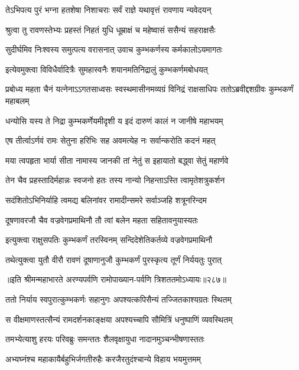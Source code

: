 \twolineshloka
{तेऽभिपत्य पुरं भग्ना हतशेषा निशाचराः}
{सर्वं राज्ञे यथावृत्तं रावणाय न्यवेदयन्}


\twolineshloka
{श्रुत्वा तु रावणस्तेभ्यः प्रहस्तं निहतं युधि}
{धूम्राक्षं च महेष्वासं ससैन्यं सहराक्षसैः}


\twolineshloka
{सुदीर्घमिव निःश्वस्य समुत्पत्य वरासनात्}
{उवाच कुम्भकर्णस्य कर्मकालोऽयमागतः}


\twolineshloka
{इत्येवमुक्त्वा विविधैर्वादित्रैः सुमहास्वनैः}
{शयानमतिनिद्रालुं कुम्भकर्णमबोधयत्}


\threelineshloka
{प्रबोध्य महता चैनं यत्नेनाऽऽगतसाध्वसः}
{स्वस्थमासीनमव्यग्रं विनिद्रं राक्षसाधिपः}
{ततोऽब्रवीद्दशग्रीवः कुम्भकर्णं महाबलम्}


\twolineshloka
{धन्योसि यस्य ते निद्रा कुम्भकर्णेयमीदृशी}
{य इदं दारुणं कालं न जानीषे महाभयम्}


\twolineshloka
{एष तीर्त्वाऽर्णवं रामः सेतुना हरिभिः सह}
{अवमत्येह नः सर्वान्करोति कदनं महत्}


\twolineshloka
{मया त्वपहृता भार्या सीता नामास्य जानकी}
{तां नेतुं स इहायातो बद्ध्वा सेतुं महार्णवे}


\twolineshloka
{तेन चैव प्रहस्तादिर्महान्नः स्वजनो हतः}
{तस्य नान्यो निहन्ताऽस्ति त्वामृतेशत्रुकर्शन}


\twolineshloka
{सदंशितोऽभिनिर्याहि त्वमद्य बलिनांवर}
{रामादीन्समरे सर्वाञ्जहि शत्रूनरिन्दम}


\twolineshloka
{दूषणावरजौ चैव वज्रवेगप्रमाथिनौ}
{तौ त्वां बलेन महता सहितावनुयास्यतः}


\twolineshloka
{इत्युक्त्वा राक्षुसपतिः कुम्भकर्णं तरस्विनम्}
{सन्दिदेशेतिकर्तव्ये वज्रवेगप्रमाथिनौ}


\twolineshloka
{तथेत्युक्त्वा युतौ वीरौ रावणं दूषाणानुजौ}
{कुम्भकर्णं पुरस्कृत्य तूर्णं निर्ययतुः पुरात्}


॥इति श्रीमन्महाभारते अरण्यपर्वणि रामोपाख्यान-पर्वणि त्रिशततमोऽध्यायः॥२८७॥

\storymeta

\resetShloka



\twolineshloka
{ततो निर्याय स्वपुरात्कुम्भकर्णः सहानुगः}
{अपश्यत्कपिसैन्यं तज्जितकाश्यग्रतः स्थितम्}


\twolineshloka
{स वीक्षमाणस्तत्सैन्यं रामदर्शनकाङ्क्षया}
{अपश्यच्चापि सौमित्रिं धनुष्पाणिं व्यवस्थितम्}


\twolineshloka
{तमभ्येत्याशु हरयः परिवब्रुः समन्ततः}
{शैलवृक्षायुधा नादानमुञ्चन्भीषणास्ततः}


\twolineshloka
{अभ्यघ्नंश्च महाकायैर्बहुभिर्जगतीरुहैः}
{करजैरतुदंश्चान्ये विहाय भयमुत्तमम्}


